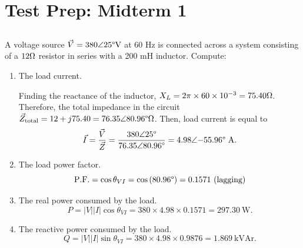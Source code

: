 \documentclass{article}
\begin{document}
\section{Test Prep: Midterm 1}
\subsection{} A voltage source \(\vec{V} = 380\angle{25\degree} \mathrm{V}\) at 60 Hz is connected across a system consisting of a \(12\ohm\) resistor in series with a 200 mH inductor. Compute:
\begin{enumerate}[label=\alph*)]
	\item The load current.
		
		Finding the reactance of the inductor, \(X_L = 2\pi \times 60 \time 200 \times 10^{-3} = 75.40 \ohm\). Therefore, the total impedance in the circuit \(\vec{Z}_{\mathrm{total}} = 12 + j75.40 = 76.35 \angle{80.96 \degree}\ohm\). Then, load current is equal to \[
			\vec{I} = \frac{\vec{V}}{\vec{Z}} = \frac{380\angle{25 \degree}}{76.35\angle{80.96\degree}} = 4.98\angle{-55.96\degree} \ \mathrm{A}.
		\]
	\item The load power factor.
		\[
			\mathrm{P.F.} = \cos{\theta_{VI}} = \cos{(80.96\degree)} = 0.1571 \ \mathrm{(lagging)}
		\]
	\item The real power consumed by the load.
		\[
			P = |V||I|\cos{\theta_{VI}} = 380 \times 4.98 \times 0.1571 = 297.30 \ \mathrm{W}.
		\]
	\item The reactive power consumed by the load.
		\[
			Q = |V||I|\sin{\theta_{VI}} = 380 \times 4.98 \times 0.9876 = 1.869 \ \mathrm{kVAr}.
		\]
\end{enumerate}
\end{document}
